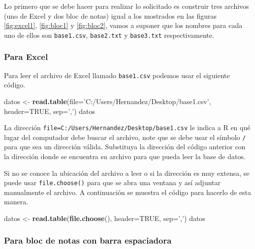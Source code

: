 \documentclass[10pt,]{krantz}
\makeatletter
\newenvironment{Shaded}{\begin{snugshade}}{\end{snugshade}}
\newcommand{\KeywordTok}[1]{\textcolor[rgb]{0.13,0.29,0.53}{\textbf{{#1}}}}
\newcommand{\DataTypeTok}[1]{\textcolor[rgb]{0.13,0.29,0.53}{{#1}}}
\newcommand{\StringTok}[1]{\textcolor[rgb]{0.31,0.60,0.02}{{#1}}}
\newcommand{\OtherTok}[1]{\textcolor[rgb]{0.56,0.35,0.01}{{#1}}}
\newcommand{\NormalTok}[1]{{#1}}
\let\proglang=\textsf
\newenvironment{kframe}{%
\medskip{}
\setlength{\fboxsep}{.8em}
 \def\at@end@of@kframe{}%
 \ifinner\ifhmode%
  \def\at@end@of@kframe{\end{minipage}}%
  \begin{minipage}{\columnwidth}%
 \fi\fi%
 \def\FrameCommand##1{\hskip\@totalleftmargin \hskip-\fboxsep
 \colorbox{shadecolor}{##1}\hskip-\fboxsep
     \hskip-\linewidth \hskip-\@totalleftmargin \hskip\columnwidth}%
 \MakeFramed {\advance\hsize-\width
   \@totalleftmargin\z@ \linewidth\hsize
   \@setminipage}}%
 {\par\unskip\endMakeFramed%
 \at@end@of@kframe}
\renewenvironment{Shaded}{\begin{kframe}}{\end{kframe}}
\makeatother
\begin{document}
Lo primero que se debe hacer para realizar lo solicitado es construir
tres archivos (uno de Excel y dos bloc de notas) igual a los mostrados
en las figuras \ref{fig:excel1}, \ref{fig:bloc1} y \ref{fig:bloc2},
vamos a suponer que los nombres para cada uno de ellos son
\texttt{base1.csv}, \texttt{base2.txt} y \texttt{base3.txt}
respectivamente.

\subsubsection*{Para Excel}\label{para-excel}


Para leer el archivo de Excel llamado \texttt{base1.csv} podemos usar el
siguiente código.

\begin{Shaded}
\begin{Highlighting}[]
\NormalTok{datos <-}\StringTok{ }\KeywordTok{read.table}\NormalTok{(}\DataTypeTok{file=}\StringTok{'C:/Users/Hernandez/Desktop/base1.csv'}\NormalTok{,}
                    \DataTypeTok{header=}\OtherTok{TRUE}\NormalTok{, }\DataTypeTok{sep=}\StringTok{','}\NormalTok{)}
\NormalTok{datos}
\end{Highlighting}
\end{Shaded}

La dirección
\texttt{file=\textquotesingle{}C:/Users/Hernandez/Desktop/base1.csv\textquotesingle{}}
le indica a \proglang{R} en qué lugar del computador debe buscar el
archivo, note que se debe usar el símbolo \texttt{/} para que sea un
dirección válida. Substituya la dirección del código anterior con la
dirección donde se encuentra su archivo para que pueda leer la base de
datos.

Si no se conoce la ubicación del archivo a leer o si la dirección es muy
extensa, se puede usar \texttt{file.choose()} para que se abra una
ventana y así adjuntar manualmente el archivo. A continuación se muestra
el código para hacerlo de esta manera.

\begin{Shaded}
\begin{Highlighting}[]
\NormalTok{datos <-}\StringTok{ }\KeywordTok{read.table}\NormalTok{(}\KeywordTok{file.choose}\NormalTok{(), }\DataTypeTok{header=}\OtherTok{TRUE}\NormalTok{, }\DataTypeTok{sep=}\StringTok{','}\NormalTok{)}
\NormalTok{datos}
\end{Highlighting}
\end{Shaded}

\subsubsection*{Para bloc de notas con barra
espaciadora}\label{para-bloc-de-notas-con-barra-espaciadora}
\end{document}
